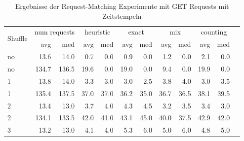 \documentclass[12pt,a4paper]{report}
\begin{document}
\begin{table}[H]
	\centering
	\caption{Ergebnisse der Request-Matching Experimente mit GET Requests mit Zeitstempeln}
	\label{tab:get_ts}
	\begin{tabular}{|l|r|r|r|r|r|r|r|r|r|r|r|}
		\hline
		\multirow{2}{*}{Shuffle} & \multicolumn{2}{|c|}{num requests} & \multicolumn{2}{|c|}{heuristic} & \multicolumn{2}{|c|}{exact} & \multicolumn{2}{|c|}{mix} & \multicolumn{2}{|c|}{counting}                                    \\ \cline{2-11}
		                         & avg                                & med                             & avg                         & med                       & avg                            & med  & avg  & med  & avg  & med  \\ \hline
		no                       & 13.6                               & 14.0                            & 0.7                         & 0.0                       & 0.9                            & 0.0  & 1.2  & 0.0  & 2.1  & 0.0  \\ \hline
		no                       & 134.7                              & 136.5                           & 19.6                        & 0.0                       & 19.0                           & 0.0  & 9.4  & 0.0  & 19.9 & 0.0  \\ \hline
		1                        & 13.8                               & 14.0                            & 3.3                         & 3.0                       & 3.0                            & 2.5  & 3.8  & 4.0  & 3.0  & 3.5  \\ \hline
		1                        & 135.4                              & 137.5                           & 37.0                        & 37.0                      & 36.2                           & 35.0 & 36.7 & 36.5 & 38.1 & 39.5 \\ \hline
		2                        & 13.4                               & 13.0                            & 3.7                         & 4.0                       & 4.3                            & 4.5  & 3.2  & 3.5  & 3.4  & 3.0  \\ \hline
		2                        & 134.1                              & 133.5                           & 42.0                        & 41.0                      & 43.1                           & 45.0 & 40.0 & 37.5 & 42.9 & 42.0 \\ \hline
		3                        & 13.2                               & 13.0                            & 4.1                         & 4.0                       & 5.3                            & 6.0  & 5.0  & 6.0  & 4.8  & 5.0  \\ \hline

\end{tabular}
\end{table}
\end{document}
